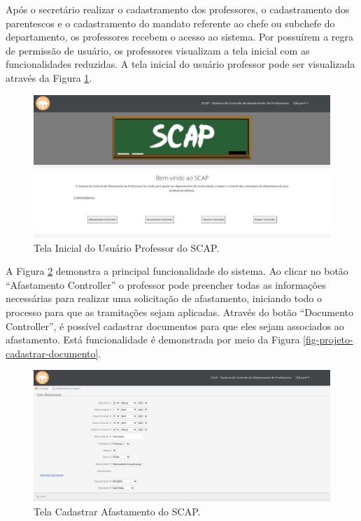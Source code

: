 Após o secretário realizar o cadastramento dos professores, o cadastramento dos parentescos e o cadastramento do mandato referente ao chefe ou subchefe do departamento, os professores recebem o acesso ao sistema. Por possuírem a regra de permissão de usuário, os professores visualizam a tela inicial com as funcionalidades reduzidas. A tela inicial do usuário professor pode ser visualizada através da Figura \ref{fig-projeto-usuario-professor}. 

\begin{figure}[h]
	\centering
	\includegraphics[scale=0.33]{figuras/fig-projeto-usuario-professor} 
	\caption{Tela Inicial do Usuário Professor do SCAP.}
	\label{fig-projeto-usuario-professor}
\end{figure}

A Figura \ref{fig-projeto-cadastrar-afastamento} demonstra a principal funcionalidade do sistema. Ao clicar no botão ``Afastamento Controller'' o professor pode preencher todas as informações necessárias para realizar uma solicitação de afastamento, iniciando todo o processo para que as tramitações sejam aplicadas. Através do botão ``Documento Controller'', é possível cadastrar documentos para que eles sejam associados ao afastamento. Está funcionalidade é demonstrada por meio da Figura \ref{fig-projeto-cadastrar-documento}.   

\begin{figure}[h]
	\centering
	\includegraphics[scale=0.33]{figuras/fig-projeto-cadastrar-afastamento} 
	\caption{Tela Cadastrar Afastamento do SCAP.}
	\label{fig-projeto-cadastrar-afastamento}
\end{figure}

